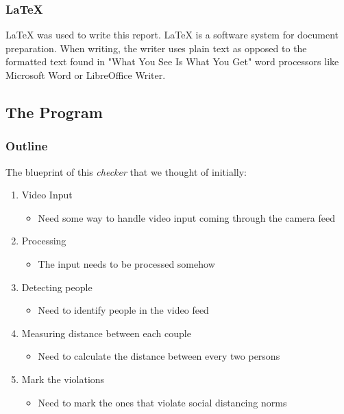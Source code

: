 \documentclass[a4paper]{article}
\begin{document}
\subsubsection{LaTeX}
LaTeX was used to write this report. LaTeX is a software system for document
preparation. When writing, the writer uses plain text as opposed to the formatted
text found in "What You See Is What You Get" word processors like Microsoft Word
or LibreOffice Writer.
\pagebreak

\subsection{The Program}

\subsubsection{Outline}
The blueprint of this \textit{checker} that we thought of initially:

\begin{enumerate}
    \item Video Input
          \begin{itemize}[label={}]
              \item Need some way to handle video input coming through the camera feed
          \end{itemize}

    \item Processing
          \begin{itemize}[label={}]
              \item The input needs to be processed somehow
          \end{itemize}

    \item Detecting people
          \begin{itemize}[label={}]
              \item Need to identify people in the video feed
          \end{itemize}

    \item Measuring distance between each couple
          \begin{itemize}[label={}]
              \item Need to calculate the distance between every two persons
          \end{itemize}

    \item Mark the violations
          \begin{itemize}[label={}]
              \item Need to mark the ones that violate social distancing norms
          \end{itemize}
\end{enumerate}
\end{document}
